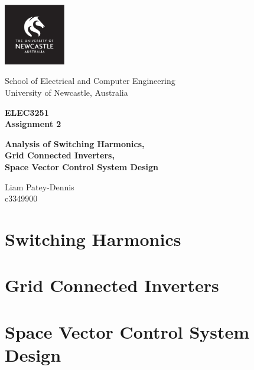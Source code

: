 \documentclass[12pt,twoside]{scrartcl}
\begin{document}
\setcounter{page}{1}
\begin{titlepage}
    \begin{center}

        \includegraphics[width=0.2\textwidth]{LOGO_Square.pdf}

        \vspace*{0.4cm}
        School of Electrical and Computer Engineering \\
        University of Newcastle, Australia
        
        \vspace{1cm}
        \huge
        \textbf{\textsf{ELEC3251 \\ }}
        \vspace{0.2cm}
        \huge
        \textbf{\textsf{Assignment 2}}

        \vspace{0.5cm}
        \large
        \textbf{\textsf{Analysis of Switching Harmonics, \\ 
                        Grid Connected Inverters, \\ 
                        Space Vector Control System Design
                        }}

        \vspace{1.5cm}
        \normalsize
        Liam Patey-Dennis \\
        c3349900
        \vfill    
    \end{center}
\end{titlepage}


\section{Switching Harmonics}
\section{Grid Connected Inverters}
\section{Space Vector Control System Design}



\newpage


\end{document}
